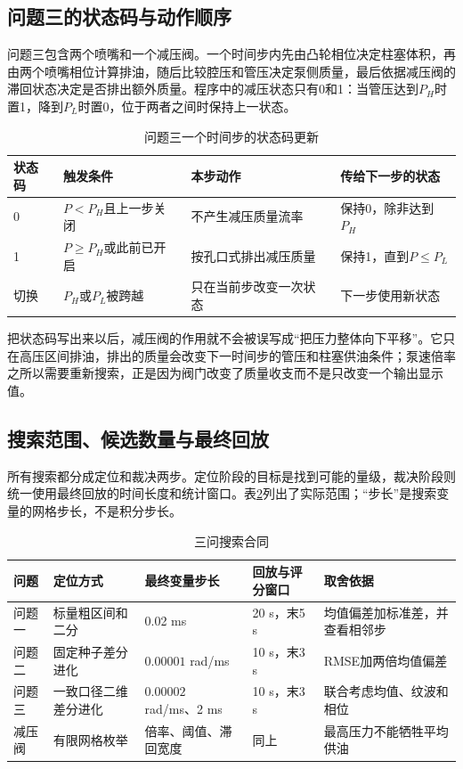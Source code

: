 \documentclass[UTF8,11pt,a4paper]{ctexart}
\begin{document}
\subsection{问题三的状态码与动作顺序}

问题三包含两个喷嘴和一个减压阀。一个时间步内先由凸轮相位决定柱塞体积，再由两个喷嘴相位计算排油，随后比较腔压和管压决定泵侧质量，最后依据减压阀的滞回状态决定是否排出额外质量。程序中的减压状态只有0和1：当管压达到$P_H$时置1，降到$P_L$时置0，位于两者之间时保持上一状态。

\begin{table}[H]
\centering
\caption{问题三一个时间步的状态码更新}
\label{tab:q3-state-code-a}
\small
\begin{tabularx}{\textwidth}{p{1.4cm}p{4.0cm}p{4.0cm}X}
\toprule
状态码 & 触发条件 & 本步动作 & 传给下一步的状态\\
\midrule
0 & $P<P_H$且上一步关闭 & 不产生减压质量流率 & 保持0，除非达到$P_H$\\
1 & $P\geq P_H$或此前已开启 & 按孔口式排出减压质量 & 保持1，直到$P\leq P_L$\\
切换 & $P_H$或$P_L$被跨越 & 只在当前步改变一次状态 & 下一步使用新状态\\
\bottomrule
\end{tabularx}
\end{table}

把状态码写出来以后，减压阀的作用就不会被误写成“把压力整体向下平移”。它只在高压区间排油，排出的质量会改变下一时间步的管压和柱塞供油条件；泵速倍率之所以需要重新搜索，正是因为阀门改变了质量收支而不是只改变一个输出显示值。

\subsection{搜索范围、候选数量与最终回放}

所有搜索都分成定位和裁决两步。定位阶段的目标是找到可能的量级，裁决阶段则统一使用最终回放的时间长度和统计窗口。表\ref{tab:search-contract-a}列出了实际范围；“步长”是搜索变量的网格步长，不是积分步长。

\begin{table}[H]
\centering
\caption{三问搜索合同}
\label{tab:search-contract-a}
\small
\begin{tabularx}{\textwidth}{p{1.9cm}p{3.7cm}p{3.4cm}p{3.5cm}X}
\toprule
问题 & 定位方式 & 最终变量步长 & 回放与评分窗口 & 取舍依据\\
\midrule
问题一 & 标量粗区间和二分 & 0.02 ms & 20 s，末5 s & 均值偏差加标准差，并查看相邻步\\
问题二 & 固定种子差分进化 & $0.00001$ rad/ms & 10 s，末3 s & RMSE加两倍均值偏差\\
问题三 & 一致口径二维差分进化 & $0.00002$ rad/ms、2 ms & 10 s，末3 s & 联合考虑均值、纹波和相位\\
减压阀 & 有限网格枚举 & 倍率、阈值、滞回宽度 & 同上 & 最高压力不能牺牲平均供油\\
\bottomrule
\end{tabularx}
\end{table}
\end{document}
